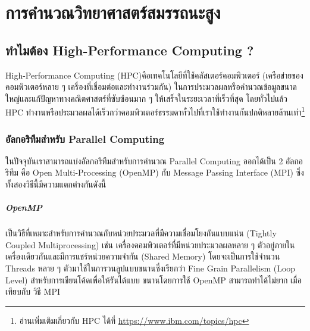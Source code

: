 

\chapter{การคำนวณวิทยาศาสตร์สมรรถนะสูง}
\label{ch:high_perf_comp}

\section{ทำไมต้อง High-Performance Computing ?}

High-Performance Computing (HPC)คือเทคโนโลยีที่ใช้คลัสเตอร์คอมพิวเตอร์ (เครือข่ายของคอมพิวเตอร์หลาย ๆ เครื่องที่เชื่อมต่อและทำงานร่วมกัน)
ในการประมวลผลหรือคำนวณข้อมูลขนาดใหญ่และแก้ปัญหาทางคณิตศาสตร์ที่ซับซ้อนมาก ๆ ให้เสร็จในระยะเวลาที่เร็วที่สุด โดยทั่วไปแล้ว HPC
ทำงานหรือประมวลผลได้เร็วกว่าคอมพิวเตอร์ธรรมดาทั่วไปที่เราใช้ทำงานกันปกติหลายล้านเท่า\footnote{อ่านเพิ่มเติมเกี่ยวกับ HPC ได้ที่ 
\url{https://www.ibm.com/topics/hpc}}

\subsection{อัลกอริทึมสำหรับ Parallel Computing}

ในปัจจุบันเราสามารถแบ่งอัลกอริทึมสำหรับการคำนวณ Parallel Computing ออกได้เป็น 2 อัลกอริทึม คือ Open Multi-Processing (OpenMP)
กับ Message Passing Interface (MPI) ซึ่งทั้งสองวิธีนี้มีความแตกต่างกันดังนี้

\paragraph{OpenMP}
เป็นวิธีที่เหมาะสำหรับการคำนวณกับหน่วยประมวลที่มีความเชื่อมโยงกันแบบแน่น (Tightly Coupled Multiprocessing) เช่น
เครื่องคอมพิวเตอร์ที่มีหน่วยประมวลผลหลาย ๆ ตัวอยู่ภายในเครื่องเดียวกันและมีการแชร์หน่วยความจำกัน (Shared Memory) โดยจะเป็นการใช้จำนวน
Threads หลาย ๆ ตัวมาใช้ในการวนลูปแบบขนานซึ่งเรียกว่า Fine Grain Parallelism (Loop Level) สำหรับการเขียนโค้ดเพื่อให้รันได้แบบ%
ขนานโดยการใช้ OpenMP สามารถทำได้ไม่ยาก เมื่อเทียบกับ วิธี MPI

